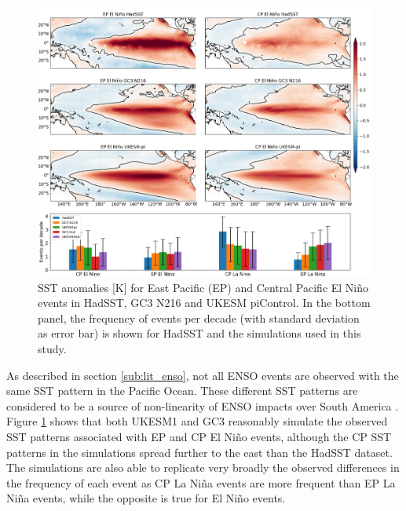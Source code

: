 \begin{figure}[b!]
\includegraphics[width=\linewidth]{figures/epcpmap}
\caption[Diversity of ENSO SST patterns]{SST anomalies [K] for East Pacific (EP) and Central Pacific El Niño events in HadSST, GC3 N216 and UKESM piControl.  In the bottom panel, the frequency of events per decade (with standard deviation as error bar) is shown for HadSST and the simulations used in this study.
}
\label{fig:s1}
\end{figure}


  
As described in section \ref{sub:lit_enso}, not all ENSO events are observed with the same SST  pattern in the Pacific Ocean. These different SST patterns are considered to be a source of non-linearity of ENSO impacts over South America \citep{sulca2018,cai2020}.
Figure \ref{fig:s1} shows that both UKESM1 and GC3 reasonably simulate the observed SST patterns associated with EP and CP El Niño events, although the CP SST patterns in the simulations spread further to the east than the HadSST dataset.
The simulations are also able to replicate very broadly the observed differences in the frequency of each event as CP La Niña events are more frequent than EP La Niña events, while the opposite is true for El Niño events.

